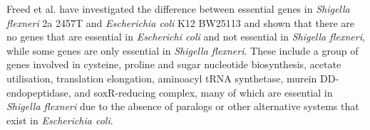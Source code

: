 \documentclass[12pt,letterpaper]{article}
\begin{document}
Freed et al. \cite{freed_combining_2016} have investigated the difference between essential genes in \textit{Shigella flexneri} 2a 2457T and \textit{Escherichia coli} K12 BW25113 and shown that there are no genes that are essential in \textit{Escherichi coli} and not essential in \textit{Shigella flexneri}, while some genes are only essential in \textit{Shigella flexneri}. These include a group of genes involved in cysteine, proline and sugar nucleotide biosynthesis, acetate utilisation, translation elongation, aminoacyl tRNA synthetase, murein DD-endopeptidase, and soxR-reducing complex, many of which are essential in \textit{Shigella flexneri} due to the absence of paralogs or other alternative systems that exist in \textit{Escherichia coli}.
\end{document}

